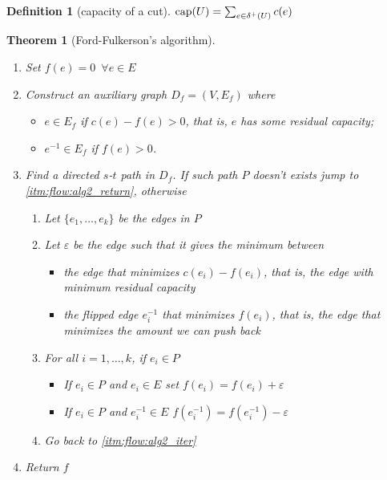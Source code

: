 \documentclass[8pt]{extarticle}
\newcommand{\skiplineafterproof}{$ $\par\nobreak\ignorespaces}
\newtheorem{theorem}{Theorem}[section]
\theoremstyle{definition}
\newtheorem{definition}{Definition}[section]
\theoremstyle{remark}
\numberwithin{equation}{section}
\begin{document}
\begin{landscape}
\begin{multicols}{3}
        \begin{definition}[capacity of a cut]${\operatorfont cap}(U) = \sum_{e \in \delta^+(U)} c(e)$
        \end{definition}

        \begin{theorem}[Ford-Fulkerson's algorithm]
            \skiplineafterproof
            \begin{enumerate}
                \item Set $f(e) = 0 \enspace \forall e \in E$
                \item \label{itm:flow:alg2_iter} Construct an auxiliary graph $D_f = (V, E_f)$ where
                      \begin{itemize}
                          \item $e \in E_f$ if $c(e) - f(e) > 0$, that is, $e$ has some residual capacity;
                          \item $e^{-1} \in E_f$ if $f(e) > 0$.
                      \end{itemize}
                \item Find a directed $s$-$t$ path in $D_f$. If such path $P$ doesn't exists jump to \autoref{itm:flow:alg2_return}, otherwise
                      \begin{enumerate}[label*=\arabic*.]
                          \item Let $\{e_1, \ldots, e_k\}$ be the edges in $P$
                          \item Let $\varepsilon$ be the edge such that it gives the minimum between
                                \begin{itemize}
                                    \item the edge that minimizes $c(e_i) - f(e_i)$, that is, the edge with minimum residual capacity
                                    \item the flipped edge $e^{-1}_i$ that minimizes $f(e_i)$, that is, the edge that minimizes the amount we can push back
                                \end{itemize}
                          \item For all $i = 1, \ldots, k$, if $e_i \in P$
                                \begin{itemize}
                                    \item If $e_i \in P$ and $e_i \in E$ set $f(e_i) = f(e_i) + \varepsilon$
                                    \item If $e_i \in P$ and $e_i^{-1} \in E$ $f(e_i^{-1}) = f(e_i^{-1}) - \varepsilon$
                                \end{itemize}
                          \item Go back to \autoref{itm:flow:alg2_iter}
                      \end{enumerate}
                \item \label{itm:flow:alg2_return} Return $f$
            \end{enumerate}
        \end{theorem}


\end{multicols}
\end{landscape}
\end{document}
